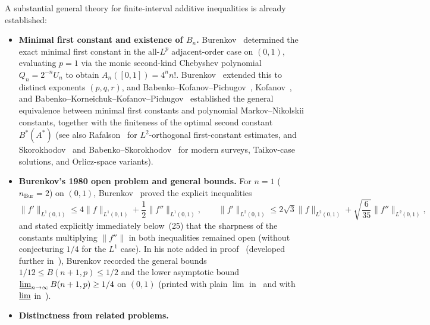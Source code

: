 \documentclass[11pt,a4paper]{article}
\theoremstyle{remark}
\numberwithin{equation}{section}
\begin{document}
A substantial general theory for finite-interval additive inequalities is already established:
\begin{itemize}[leftmargin=1.8em]
    \item \textbf{Minimal first constant and existence of $B_n$.}
    Burenkov~\cite[Theorem, p.~23; \S4$^\circ$, p.~26]{Burenkov1980} determined the exact minimal first constant in the all-$L^p$ adjacent-order case on $(0,1)$, evaluating $p = 1$ via the monic second-kind Chebyshev polynomial $Q_n = 2^{-n}U_n$ to obtain $A_n([0,1]) = 4^n n!$. Burenkov~\cite[Theorem~1]{Burenkov1986} extended this to distinct exponents $(p,q,r)$, and Babenko--Kofanov--Pichugov~\cite{BKP1997}, Kofanov~\cite[\S4.3, Theorem~4.3.2]{Kofanov2002}, and Babenko--Korneichuk--Kofanov--Pichugov~\cite[\S4.6, Theorem~4.6.2]{BKKP2003} established the general equivalence between minimal first constants and polynomial Markov--Nikolskii constants, together with the finiteness of the optimal second constant $B^*(A^*)$ (see also Rafalson~\cite{Rafalson2004} for $L^2$-orthogonal first-constant estimates, and Skorokhodov~\cite{Skorokhodov2019,Skorokhodov2022} and Babenko--Skorokhodov~\cite{BabenkoSkorokhodov2012} for modern surveys, Taikov-case solutions, and Orlicz-space variants).
    \item \textbf{Burenkov's 1980 open problem and general bounds.}
    For $n = 1$ ($n_{\mathrm{Bur}} = 2$) on $(0,1)$, Burenkov~\cite[\S10$^\circ$, eqs.~(24)--(25), pp.~26--27]{Burenkov1980} proved the explicit inequalities
    \[
        \lVert f'\rVert_{L^1(0,1)} \le 4\lVert f\rVert_{L^1(0,1)} + \frac12\lVert f''\rVert_{L^1(0,1)},
        \qquad
        \lVert f'\rVert_{L^2(0,1)} \le 2\sqrt{3}\lVert f\rVert_{L^2(0,1)} + \sqrt{\frac{6}{35}}\lVert f''\rVert_{L^2(0,1)},
    \]
    and stated explicitly immediately below~(25) that the sharpness of the constants multiplying $\lVert f''\rVert$ in both inequalities remained open (without conjecturing $1/4$ for the $L^1$ case). In his note added in proof~\cite[p.~29]{Burenkov1980} (developed further in~\cite[Theorem~2]{Burenkov1986}), Burenkov recorded the general bounds $1/12 \le B(n+1, p) \le 1/2$ and the lower asymptotic bound $\varliminf_{n\to\infty} B(n+1, p) \ge 1/4$ on $(0,1)$ (printed with plain $\lim$ in~\cite[p.~29]{Burenkov1980} and with $\varliminf$ in~\cite[Theorem~2(5), eq.~(17)]{Burenkov1986}).
    \item \textbf{Distinctness from related problems.}

\end{itemize}
\end{document}
